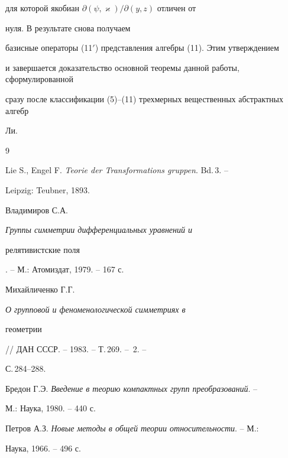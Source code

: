 для которой якобиан $\partial(\psi,\varkappa)/\partial(y,z)$ отличен от 


нуля. В результате снова получаем 


базисные операторы (11${}'$) представления алгебры (11). Этим утверждением 


и завершается доказательство основной теоремы данной работы, сформулированной


сразу после классификации (5)--(11) трехмерных вещественных абстрактных алгебр 


Ли. 


 


\begin{thebibliography}{9} 


 




Lie S., Engel F. {\em Teorie der Transformations gruppen}. Bd.\,3. -- 


Leipzig: Teubner, 1893. 




Владимиров С.А. {\em Группы симметрии дифференциальных уравнений и 


релятивистские поля}. -- М.: Атомиздат, 1979. -- 167 с. 




Михайличенко Г.Г. {\em О групповой и феноменологической симметриях в 


геометрии} // ДАН СССР. -- 1983. -- Т.\,269. -- \No\,2. -- 


С.\,284--288. 




Бредон Г.Э. {\em Введение в теорию компактных групп преобразований}. -- 


М.: Наука, 1980. -- 440 с. 




Петров А.З. {\em Новые методы в общей теории относительности}. -- М.: 


Наука, 1966. -- 496 с. 


 


\end{thebibliography} 


 


\vskip 2cm 


 








 


 


